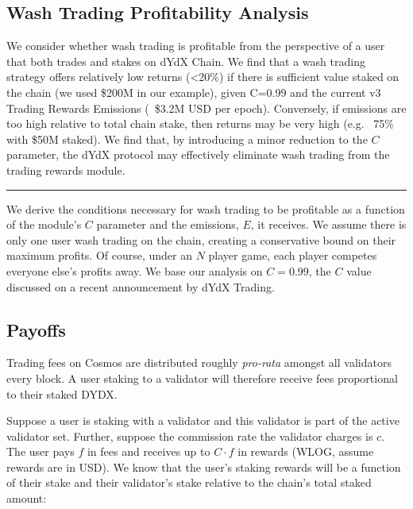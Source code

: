 \begin{fullwidth}
    \section{Wash Trading Profitability Analysis} \label{app:wash}

    \begin{adjustwidth}{2cm}{2cm}
        \justify
        We consider whether wash trading is profitable from the perspective of a user that both trades and stakes on dYdX Chain. We find that a wash trading strategy offers relatively low returns (<20\%) if there is sufficient value staked on the chain (we used \$200M in our example), given C=0.99 and the current v3 Trading Rewards Emissions (~\$3.2M USD per epoch). Conversely, if emissions are too high relative to total chain stake, then returns may be very high (e.g. ~75\% with \$50M staked). We find that, by introducing a minor reduction to the $C$ parameter, the dYdX protocol may effectively eliminate wash trading from the trading rewards module.
    \end{adjustwidth}
    
    \textcolor{gray}{\rule{\linewidth}{0.1mm}}
\end{fullwidth}

    We derive the conditions necessary for wash trading to be profitable as a function of the module's $C$ parameter and the emissions, $E$, it receives. We assume there is only one user wash trading on the chain, creating a conservative bound on their maximum profits. Of course, under an $N$ player game, each player competes everyone else's profits away. We base our analysis on $C=0.99$, the $C$ value discussed on a recent announcement by dYdX Trading.

    \subsection{Payoffs}

        Trading fees on Cosmos are distributed roughly \textit{pro-rata} amongst all validators every block. A user staking to a validator will therefore receive fees proportional to their staked DYDX.

        Suppose a user is staking with a validator and this validator is part of the active validator set. Further, suppose the commission rate the validator charges is $c$. The user pays $f$ in fees and receives up to $C\cdot f$ in rewards (WLOG, assume rewards are in USD). We know that the user's staking rewards will be a function of their stake and their validator’s stake relative to the chain’s total staked amount:
        
